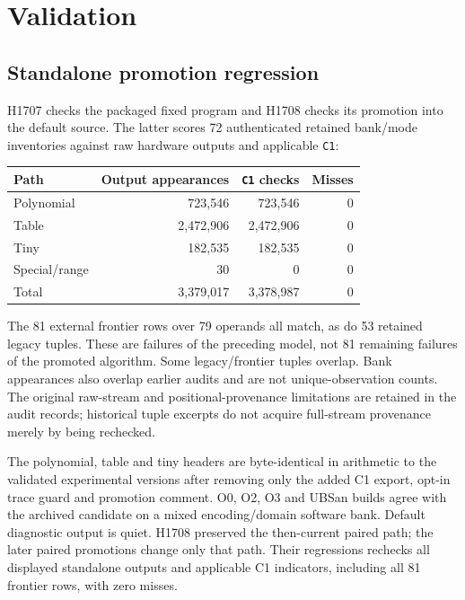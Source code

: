 \documentclass[11pt]{article}
\begin{document}
\section{Validation}
\label{sec:validation}

\subsection{Standalone promotion regression}

H1707 checks the packaged fixed program and H1708 checks its promotion into
the default source. The latter scores 72 authenticated retained bank/mode
inventories against raw hardware outputs and applicable \texttt{C1}:
\begin{center}
\begin{tabular}{lrrr}
\toprule
Path & Output appearances & \texttt{C1} checks & Misses\\
\midrule
Polynomial & 723{,}546 & 723{,}546 & 0\\
Table & 2{,}472{,}906 & 2{,}472{,}906 & 0\\
Tiny & 182{,}535 & 182{,}535 & 0\\
Special/range & 30 & 0 & 0\\
\midrule
Total & 3{,}379{,}017 & 3{,}378{,}987 & 0\\
\bottomrule
\end{tabular}
\end{center}
The 81 external frontier rows over 79 operands all match, as do 53 retained
legacy tuples. These are failures of the preceding model, not 81 remaining
failures of the promoted algorithm. Some legacy/frontier tuples overlap.
Bank appearances also overlap earlier audits and are not unique-observation
counts. The original raw-stream and positional-provenance limitations are
retained in the audit records; historical tuple excerpts do not acquire
full-stream provenance merely by being rechecked.

The polynomial, table and tiny headers are byte-identical in arithmetic to
the validated experimental versions after removing only the added C1 export,
opt-in trace guard and promotion comment. O0, O2, O3 and UBSan builds agree
with the archived candidate on a mixed encoding/domain software bank.
Default diagnostic output is quiet. H1708 preserved the then-current paired
path; the later paired promotions change only that path. Their regressions
rechecks all displayed standalone outputs and applicable C1 indicators,
including all 81 frontier rows, with zero misses.
\end{document}

